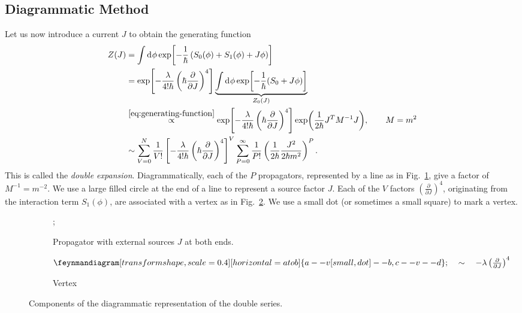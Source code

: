 \subsection{Diagrammatic Method}%
\label{sub:diagrammatic_method}

Let us now introduce a current $J$ to obtain the generating function
\begin{align}
  Z(J) &= \int \dd[]{\phi} \exp[-\frac{1}{\hbar} \left( S_0(\phi) + S_1 (\phi) + J \phi \right)] \\
       &= \exp[-\frac{\lambda}{4! \hbar} \left( \hbar \frac{\partial }{\partial J} \right)^4] \underbrace{\int \dd[]{\phi} \exp[-\frac{1}{\hbar} (S_0 + J \phi)]}_{\mathclap{Z_0 (J)}} \\
       &\stackrel{\eqref{eq:generating-function}}{\propto} \exp[-\frac{\lambda}{4! \hbar} \left( \hbar \frac{\partial }{\partial J} \right)^4] \exp(\frac{1}{2\hbar} J^T M^{-1} J), \qquad M = m^2 \\
       &\sim \sum_{V=0}^N \frac{1}{V!} \left[ -\frac{\lambda}{4! \hbar} \left( \hbar \frac{\partial }{\partial J} \right)^4 \right]^V 
       \sum_{P=0}^\infty \frac{1}{P!} \left( \frac{1}{2\hbar} \frac{J^2}{2 \hbar m^2} \right)^P \label{eq:3-star}.
\end{align}
This is called the \emph{double expansion}.
Diagrammatically, each of the $P$ propagators, represented by a line as in Fig.~\ref{fig:l3f1a}, give a factor of $M^{-1} = m^{-2}$.  We use a large filled circle at the end of a line to represent a source factor $J$.
Each of the $V$ factors $\left( \frac{\partial }{\partial J} \right)^4$, originating from the interaction term $S_1(\phi)$, are associated with a vertex as in Fig.~\ref{fig:l3f1b}. We use a small dot (or sometimes a small square) to mark a vertex.

\begin{figure}[tbph]
  \centering
  \begin{subfigure}[t]{0.5\textwidth}
    \centering
    ;
    \caption{Propagator with external sources $J$ at both ends.}
    \label{fig:l3f1a}
  \end{subfigure}%
  \begin{subfigure}[t]{0.5\textwidth}
    \centering
    $ \begin{gathered}
      \feynmandiagram[transform shape, scale=0.4][horizontal=a to b] {
        a -- v [small, dot] --b,
        c -- v -- d
      };
    \end{gathered} \quad \sim \quad
    -\lambda \left( \frac{\partial }{\partial J} \right)^4$ 
    \caption{Vertex}
    \label{fig:l3f1b}
  \end{subfigure}
  \caption{Components of the diagrammatic representation of the double series.}
  \label{fig:l3f1}
\end{figure}

